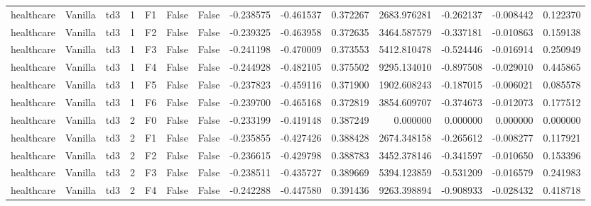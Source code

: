 \begin{tabular}{lllrlllrrrrrrr}
healthcare & Vanilla &       td3 &     1 &  F1 &           False &            False & -0.238575 & -0.461537 & 0.372267 &      2683.976281 &          -0.262137 &       -0.008442 &            0.122370 \\
healthcare & Vanilla &       td3 &     1 &  F2 &           False &            False & -0.239325 & -0.463958 & 0.372635 &      3464.587579 &          -0.337181 &       -0.010863 &            0.159138 \\
healthcare & Vanilla &       td3 &     1 &  F3 &           False &            False & -0.241198 & -0.470009 & 0.373553 &      5412.810478 &          -0.524446 &       -0.016914 &            0.250949 \\
healthcare & Vanilla &       td3 &     1 &  F4 &           False &            False & -0.244928 & -0.482105 & 0.375502 &      9295.134010 &          -0.897508 &       -0.029010 &            0.445865 \\
healthcare & Vanilla &       td3 &     1 &  F5 &           False &            False & -0.237823 & -0.459116 & 0.371900 &      1902.608243 &          -0.187015 &       -0.006021 &            0.085578 \\
healthcare & Vanilla &       td3 &     1 &  F6 &           False &            False & -0.239700 & -0.465168 & 0.372819 &      3854.609707 &          -0.374673 &       -0.012073 &            0.177512 \\
healthcare & Vanilla &       td3 &     2 &  F0 &           False &            False & -0.233199 & -0.419148 & 0.387249 &         0.000000 &           0.000000 &        0.000000 &            0.000000 \\
healthcare & Vanilla &       td3 &     2 &  F1 &           False &            False & -0.235855 & -0.427426 & 0.388428 &      2674.348158 &          -0.265612 &       -0.008277 &            0.117921 \\
healthcare & Vanilla &       td3 &     2 &  F2 &           False &            False & -0.236615 & -0.429798 & 0.388783 &      3452.378146 &          -0.341597 &       -0.010650 &            0.153396 \\
healthcare & Vanilla &       td3 &     2 &  F3 &           False &            False & -0.238511 & -0.435727 & 0.389669 &      5394.123859 &          -0.531209 &       -0.016579 &            0.241983 \\
healthcare & Vanilla &       td3 &     2 &  F4 &           False &            False & -0.242288 & -0.447580 & 0.391436 &      9263.398894 &          -0.908933 &       -0.028432 &            0.418718 \\

\end{tabular}
